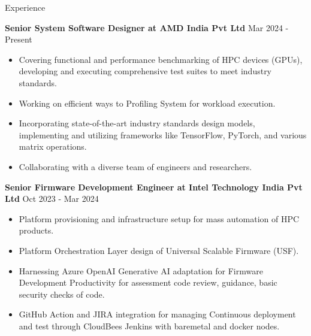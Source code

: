 \documentclass{resume} %
\begin{document}


\begin{rSection}{Experience}

{\bf Senior System Software Designer at AMD India Pvt Ltd} \hfill {Mar 2024 - Present }
\begin{itemize}
    \item Covering functional and performance benchmarking of HPC devices (GPUs), developing and executing comprehensive test suites to meet industry standards.
    \item Working on efficient ways to Profiling System for workload execution.
    \item Incorporating state-of-the-art industry standards design models, implementing and utilizing frameworks like TensorFlow, PyTorch, and various matrix operations.
    \item Collaborating with a diverse team of engineers and researchers. 
\end{itemize}

{\textbf{Senior Firmware Development Engineer at Intel Technology India Pvt Ltd}}  \hfill {Oct 2023 - Mar 2024}
\begin{itemize}
    \item Platform provisioning and infrastructure setup for mass automation of HPC products.
    \item Platform Orchestration Layer design of Universal Scalable Firmware (USF).
    \item Harnessing Azure OpenAI Generative AI adaptation for Firmware Development Productivity for assessment code review, guidance, basic security checks of code.
    \item GitHub Action and JIRA integration for managing Continuous deployment and test through CloudBees Jenkins with baremetal and docker nodes.
\end{itemize}
 

\end{rSection}
\end{document}
